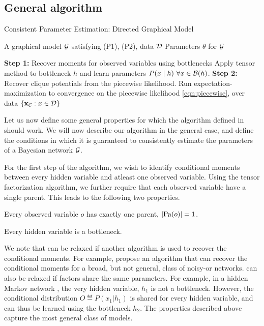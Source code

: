 \subsection{General algorithm}

\renewcommand{\algorithmicrequire}{\textbf{Input:}}
\renewcommand{\algorithmicensure}{\textbf{Output:}}
\begin{algorithm}
  \caption{Consistent Parameter Estimation: Directed Graphical Model}
  \label{algo:directed}
  \begin{algorithmic}
    \REQUIRE A graphical model $\mathcal{G}$ satisfying (P1), (P2), data $\mathcal{D}$
    \ENSURE Parameters $\theta$ for $\mathcal{G}$

    \STATE \textbf{Step 1:} Recover moments for observed variables using
    bottlenecks
        \STATE Apply tensor method to bottleneck $h$ and learn parameters $P(x \mid h) ~ \forall x \in \mathcal{B}(h)$.
      \ENDFOR
    \STATE \textbf{Step 2:} Recover clique potentials from the piecewise likelihood.
      \STATE Run expectation-maximization to convergence on the piecewise likelihood \eqref{eqn:piecewise},
        over data $\{\mathbf{x}_{\mathcal{C}} : x \in \mathcal{D}\}$
      \ENDFOR
  \end{algorithmic}
\end{algorithm}

Let us now define some general properties for which the algorithm
defined in  should work.
We will now describe our algorithm in the general case, and define the
conditions in which it is guaranteed to consistently estimate the
parameters of a Bayesian network $\mathcal{G}$.

For the first step of the algorithm, we wish to identify conditional
moments between every hidden variable and atleast one observed variable.
Using the tensor factorization algorithm, we further require that each
observed variable have a single parent. This leads to the following two
properties.

\begin{property}
  \label{prop:unique-parent}
  Every observed variable $o$ has exactly one parent, $|\textrm{Pa}(o)| = 1$.
\end{property}
\begin{property}
  \label{prop:bottleneck}
  Every hidden variable is a bottleneck.
\end{property}

We note that  can be relaxed if another
  algorithm is used to recover the conditional moments. For example,
  \citet{halpern13noisyor} propose an algorithm that can recover the
  conditional moments for a broad, but not general, class of noisy-or
  networks.
 can also be relaxed if factors share the same
  parameters. 
For example, in a hidden Markov network , the very hidden
  variable, $h_1$ is not a bottleneck. However, the conditional
  distribution $O \eqdef P(x_1|h_1)$ is shared for every hidden variable,
  and can thus be learned using the bottleneck $h_2$. 
The properties described above capture the most general class of models.


